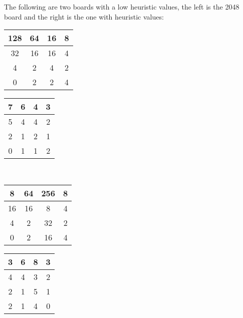 \documentclass[a4paper,12pt]{article}
\begin{document}
The following are two boards with a low heuristic values, the left is the 2048 board and the right is the one with heuristic values:
\begin{center}
\begin{tabular}{| c | c | c | c |}
        \hline
        128 & 64 & 16 & 8  \\
        \hline
        32 & 16 & 16 & 4  \\
        \hline
        4 & 2 & 4 & 2   \\
        \hline
        0 & 2 & 2 & 4\\
        \hline
\end{tabular}
\hspace{0.4cm}
\begin{tabular}{| c | c | c | c |}
        \hline
        7 & 6 & 4 & 3  \\
        \hline
        5 & 4 & 4 & 2  \\
        \hline
        2 & 1 & 2 & 1   \\
        \hline
        0 & 1 & 1 & 2   \\
        \hline
\end{tabular}
\end{center}
\\

\begin{center}
\begin{tabular}{| c | c | c | c |}
        \hline
        8 & 64 & 256 & 8  \\
        \hline
        16 & 16 & 8 & 4  \\
        \hline
        4 & 2 & 32 & 2   \\
        \hline
        0 & 2 & 16 & 4\\
        \hline
\end{tabular}
\hspace{0.4cm}
\begin{tabular}{| c | c | c | c |}
        \hline
        3 & 6 & 8 & 3  \\
        \hline
        4 & 4 & 3 & 2  \\
        \hline
        2 & 1 & 5 & 1   \\
        \hline
        2 & 1 & 4 & 0   \\
        \hline
        
\end{tabular}
\end{center}
\end{document}
